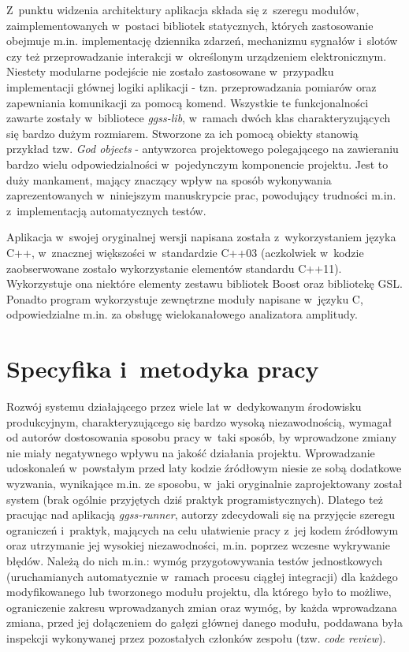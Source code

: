 Z~punktu widzenia architektury aplikacja składa się z~szeregu modułów, zaimplementowanych w~postaci bibliotek statycznych, których zastosowanie obejmuje m.in. implementację dziennika zdarzeń, mechanizmu sygnałów i~slotów czy też przeprowadzanie interakcji w~określonym urządzeniem elektronicznym. Niestety modularne podejście nie zostało zastosowane w~przypadku implementacji głównej logiki aplikacji - tzn. przeprowadzania pomiarów oraz zapewniania komunikacji za pomocą komend. Wszystkie te funkcjonalności zawarte zostały w~bibliotece \emph{ggss-lib}, w~ramach dwóch klas charakteryzujących się bardzo dużym rozmiarem. Stworzone za ich pomocą obiekty stanowią przykład tzw. \emph{God objects} - antywzorca projektowego polegającego na zawieraniu bardzo wielu odpowiedzialności w~pojedynczym komponencie projektu. Jest to duży mankament, mający znaczący wpływ na sposób wykonywania zaprezentowanych w~niniejszym manuskrypcie prac, powodujący trudności m.in. z~implementacją automatycznych testów. 

Aplikacja w~swojej oryginalnej wersji napisana została z~wykorzystaniem języka C++, w~znacznej większości w~standardzie C++03 (aczkolwiek w~kodzie zaobserwowane zostało wykorzystanie elementów standardu C++11). Wykorzystuje ona niektóre elementy zestawu bibliotek Boost oraz bibliotekę GSL. Ponadto program wykorzystuje zewnętrzne moduły napisane w~języku C, odpowiedzialne m.in. za obsługę wielokanałowego analizatora amplitudy.

\clearpage
\section{Specyfika i~metodyka pracy}
Rozwój systemu działającego przez wiele lat w~dedykowanym środowisku produkcyjnym, charakteryzującego się bardzo wysoką niezawodnością, wymagał od autorów dostosowania sposobu pracy w~taki sposób, by wprowadzone zmiany nie miały negatywnego wpływu na jakość działania projektu. Wprowadzanie udoskonaleń w~powstałym przed laty kodzie źródłowym niesie ze sobą dodatkowe wyzwania, wynikające m.in. ze sposobu, w~jaki oryginalnie zaprojektowany został system (brak ogólnie przyjętych dziś praktyk programistycznych). Dlatego też pracując nad aplikacją \emph{ggss-runner}, autorzy zdecydowali się na przyjęcie szeregu ograniczeń i~praktyk, mających na celu ułatwienie pracy z~jej kodem źródłowym oraz utrzymanie jej wysokiej niezawodności, m.in. poprzez wczesne wykrywanie błędów. Należą do nich m.in.: wymóg przygotowywania testów jednostkowych (uruchamianych automatycznie w~ramach procesu ciągłej integracji) dla każdego modyfikowanego lub tworzonego modułu projektu, dla którego było to możliwe, ograniczenie zakresu wprowadzanych zmian oraz wymóg, by każda wprowadzana zmiana, przed jej dołączeniem do gałęzi głównej danego modułu, poddawana była inspekcji wykonywanej przez pozostałych członków zespołu (tzw. \emph{code review}).


